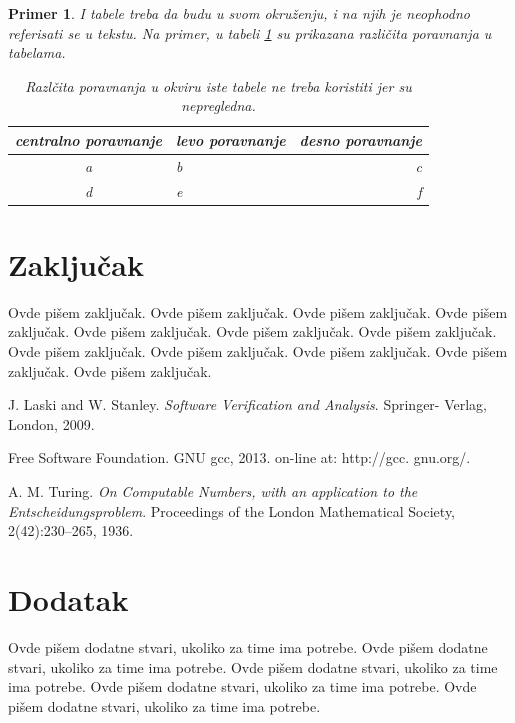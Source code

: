 \documentclass[a4paper]{article}
\newtheorem{primer}{Primer}[section]
\begin{document}
\begin{primer} I tabele treba da budu u svom okruženju, i na njih je neophodno referisati se u tekstu. Na primer, u tabeli \ref{tab:tabela1} su prikazana različita poravnanja u tabelama.

\begin{table}[h!]
\begin{center}
\caption{Razlčita poravnanja u okviru iste tabele ne treba koristiti jer su nepregledna.}
\begin{tabular}{|c|l|r|} \hline
centralno poravnanje& levo poravnanje& desno poravnanje\\ \hline
a &b&c\\ \hline
d &e&f\\ \hline
\end{tabular}
\label{tab:tabela1}
\end{center}
\end{table}

\end{primer}






\section{Zaključak}
\label{sec:zakljucak}

Ovde pišem zaključak. 
Ovde pišem zaključak. 
Ovde pišem zaključak. 
Ovde pišem zaključak. 
Ovde pišem zaključak. 
Ovde pišem zaključak. 
Ovde pišem zaključak. 
Ovde pišem zaključak. 
Ovde pišem zaključak. 
Ovde pišem zaključak. 
Ovde pišem zaključak. 
Ovde pišem zaključak. 


\appendix

\begin{thebibliography}{9}

 J. Laski and W. Stanley. \emph{Software Verification and Analysis}. Springer- Verlag, London, 2009.

 Free Software Foundation. GNU gcc, 2013. on-line at: http://gcc. gnu.org/.

 A. M. Turing. \emph{On Computable Numbers, with an application to the Entscheidungsproblem}. Proceedings of the London Mathematical Society, 2(42):230–265, 1936.


\end{thebibliography}


\appendix
\section{Dodatak}
Ovde pišem dodatne stvari, ukoliko za time ima potrebe.
Ovde pišem dodatne stvari, ukoliko za time ima potrebe.
Ovde pišem dodatne stvari, ukoliko za time ima potrebe.
Ovde pišem dodatne stvari, ukoliko za time ima potrebe.
Ovde pišem dodatne stvari, ukoliko za time ima potrebe.
\end{document}

